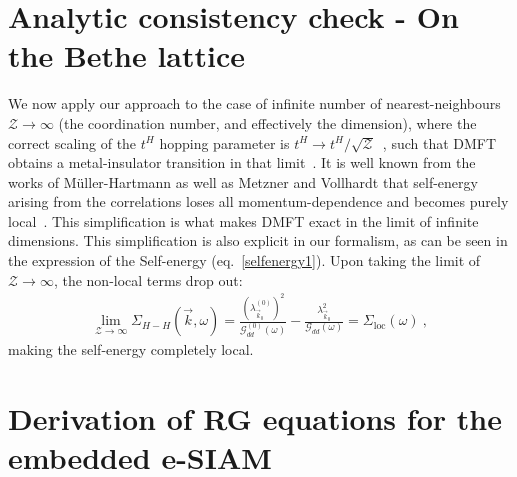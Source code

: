 \documentclass[reprint,hidelinks,onecolumn]{revtex4-2}
\begin{document}
\section{Analytic consistency check - On the Bethe lattice}
We now apply our approach to the case of infinite number of nearest-neighbours $\mathcal{Z}\to\infty$ (the coordination number, and effectively the dimension), where the correct scaling of the $t^{H}$ hopping parameter is $t^{H}\to t^{H}/\sqrt{\mathcal{Z}}$~\cite{metzner_volhardt_1989,georges_kotliar_1992,pruschke_cox_jarrel_1993}, such that DMFT obtains a metal-insulator transition in that limit~\cite{georges1996}. It is well known from the works of Müller-Hartmann as well as Metzner and Vollhardt that self-energy arising from the correlations loses all momentum-dependence and becomes purely local~\cite{Muller-Hartmann1989,metzner_volhardt_1989}. This simplification is what makes DMFT exact in the limit of infinite dimensions. This simplification is also explicit in our formalism, as can be seen in the expression of the Self-energy (eq.~\eqref{selfenergy1}). Upon taking the limit of \(\mathcal{Z}\to\infty\), the non-local terms drop out:
\begin{equation}\begin{aligned}
	\lim_{\mathcal{Z}\to\infty}\Sigma_{H-H}(\vec k,\omega) = \frac{\left(\lambda_{\vec k_0}^{(0)}\right)^2}{\mathcal{G}^{(0)}_{dd}(\omega)} - \frac{\lambda_{\vec k_0}^2}{\mathcal{G}_{dd}(\omega)} = \Sigma_\text{loc}(\omega)~,
\end{aligned}\end{equation}
making the self-energy completely local.


\section{Derivation of RG equations for the embedded e-SIAM}
\end{document}
